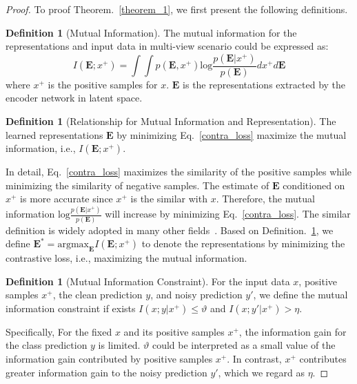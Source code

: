 \documentclass{article}
\theoremstyle{plain}
\theoremstyle{definition}
\newtheorem{definition}[theorem]{Definition}
\theoremstyle{remark}
\begin{document}
\begin{proof}
To proof Theorem.~\ref{theorem_1}, we first present the following definitions. 

\begin{definition} [Mutual Information] The mutual information for the representations and input data in multi-view scenario could be expressed as:
\begin{equation}
    I(\textbf{E}; x^+) = \int \int p(\textbf{E}, x^+) \text{log}\frac{p(\textbf{E}|x^+)}{p(\textbf{E})}dx^+d\textbf{E}
\end{equation}
where $x^+$ is the positive samples for $x$. $\textbf{E}$ is the representations extracted by the encoder network in latent space.
\end{definition}

\begin{definition} [Relationship for Mutual Information and Representation] The learned representations $\textbf{E}$ by minimizing Eq.~\eqref{contra_loss} maximize the mutual information, i.e., $I(\textbf{E}; x^+)$. 
\label{define_MR}
\end{definition}
In detail, Eq.~\eqref{contra_loss} maximizes the similarity of the positive samples while minimizing the similarity of negative samples. The estimate of $\textbf{E}$ conditioned on $x^+$ is more accurate since $x^+$ is the similar with $x$. Therefore, the mutual information $\text{log}\frac{p(\textbf{E}|x^+)}{p(\textbf{E})}$ will increase by minimizing Eq.~\eqref{contra_loss}. The similar definition is widely adopted in many other fields~\cite{tsai2020self,hjelm2018learning}. Based on Definition.~\ref{define_MR}, we define $\textbf{E}^* = \text{argmax}_{\textbf{E}}I(\textbf{E};x^+)$ to denote the representations by minimizing the contrastive loss, i.e., maximizing the mutual information.

\begin{definition} [Mutual Information Constraint] For the input data $x$, positive samples $x^+$, the clean prediction $y$, and noisy prediction $y'$, we define the mutual information constraint if exists $I(x;y|x^+) \le \vartheta$ and $I(x; y'|x^+) > \eta$.
\label{MI_const}
\end{definition}
Specifically, For the fixed $x$ and its positive samples $x^+$, the information gain for the class prediction $y$ is limited. $\vartheta$ could be interpreted as a small value of the information gain contributed by positive samples $x^+$. In contrast, $x^+$ contributes greater information gain to the noisy prediction $y'$, which we regard as $\eta$.


\end{proof}
\end{document}
